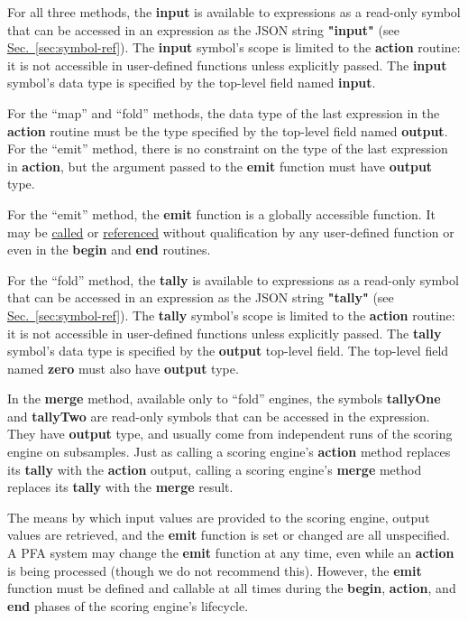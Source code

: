\documentclass{article}
\newcommand{\PFAc}{\ttfamily\bfseries}
\theoremstyle{definition}
\begin{document}
For all three methods, the {\PFAc input} is available to expressions as a read-only symbol that can be accessed in an expression as the JSON string {\PFAc "input"} (see \hyperlink{hsec:symbol-ref}{Sec.~\ref{sec:symbol-ref}}).  The {\PFAc input} symbol's scope is limited to the {\PFAc action} routine: it is not accessible in user-defined functions unless explicitly passed.  The {\PFAc input} symbol's data type is specified by the top-level field named {\PFAc input}.

For the ``map'' and ``fold'' methods, the data type of the last expression in the {\PFAc action} routine must be the type specified by the top-level field named {\PFAc output}.  For the ``emit'' method, there is no constraint on the type of the last expression in {\PFAc action}, but the argument passed to the {\PFAc emit} function must have {\PFAc output} type.

For the ``emit'' method, the {\PFAc emit} function is a globally accessible function.  It may be \hyperlink{hsec:function-call}{called} or \hyperlink{hsec:fcnref}{referenced} without qualification by any user-defined function or even in the {\PFAc begin} and {\PFAc end} routines.

For the ``fold'' method, the {\PFAc tally} is available to expressions as a read-only symbol that can be accessed in an expression as the JSON string {\PFAc "tally"} (see \hyperlink{hsec:symbol-ref}{Sec.~\ref{sec:symbol-ref}}).  The {\PFAc tally} symbol's scope is limited to the {\PFAc action} routine: it is not accessible in user-defined functions unless explicitly passed.  The {\PFAc tally} symbol's data type is specified by the {\PFAc output} top-level field.  The top-level field named {\PFAc zero} must also have {\PFAc output} type.

In the {\PFAc merge} method, available only to ``fold'' engines, the symbols {\PFAc tallyOne} and {\PFAc tallyTwo} are read-only symbols that can be accessed in the expression.  They have {\PFAc output} type, and usually come from independent runs of the scoring engine on subsamples.  Just as calling a scoring engine's {\PFAc action} method replaces its {\PFAc tally} with the {\PFAc action} output, calling a scoring engine's {\PFAc merge} method replaces its {\PFAc tally} with the {\PFAc merge} result.

The means by which input values are provided to the scoring engine, output values are retrieved, and the {\PFAc emit} function is set or changed are all unspecified.  A PFA system may change the {\PFAc emit} function at any time, even while an {\PFAc action} is being processed (though we do not recommend this).  However, the {\PFAc emit} function must be defined and callable at all times during the {\PFAc begin}, {\PFAc action}, and {\PFAc end} phases of the scoring engine's lifecycle.
\end{document}
